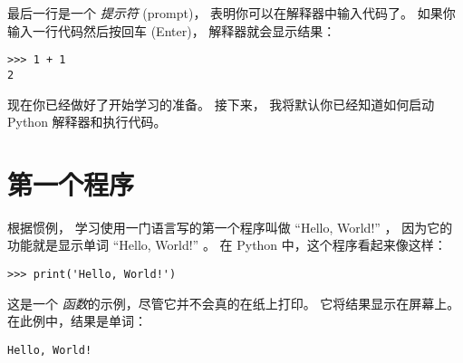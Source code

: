 
最后一行是一个 {\em 提示符} (prompt)， 表明你可以在解释器中输入代码了。  
如果你输入一行代码然后按回车 (Enter)， 解释器就会显示结果：


\begin{lstlisting}
>>> 1 + 1
2
\end{lstlisting}

%

现在你已经做好了开始学习的准备。  
接下来， 我将默认你已经知道如何启动 Python 解释器和执行代码。


\section{第一个程序}

\label{hello}


根据惯例， 学习使用一门语言写的第一个程序叫做 ``Hello, World!'' ， 
因为它的功能就是显示单词 ``Hello, World!'' 。  
在 Python 中，这个程序看起来像这样：

\begin{lstlisting}
>>> print('Hello, World!')
\end{lstlisting}

%

这是一个  {\em 函数}的示例，尽管它并不会真的在纸上打印。  
它将结果显示在屏幕上。  在此例中，结果是单词：

\begin{lstlisting}
Hello, World!
\end{lstlisting}

